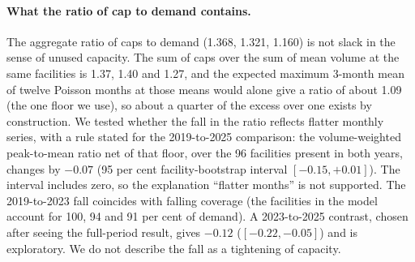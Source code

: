 \paragraph{What the ratio of cap to demand contains.} The aggregate ratio of caps to demand (1.368, 1.321, 1.160) is not slack in
the sense of unused capacity. The sum of caps over the sum of mean volume at the same facilities is 1.37, 1.40 and 1.27, and the expected maximum 3-month mean of twelve Poisson months at those means would alone give a
ratio of about 1.09 (the one floor we use), so about a quarter of the excess over one exists by construction. We tested whether the fall in the ratio reflects flatter monthly series, with a rule stated for the
2019-to-2025 comparison: the volume-weighted peak-to-mean ratio net of that floor, over the 96 facilities present in both years, changes by $-0.07$ (95 per cent facility-bootstrap interval $[-0.15, +0.01]$). The interval includes
zero, so the explanation ``flatter months'' is not supported. The 2019-to-2023 fall coincides with falling coverage (the facilities in the model account for 100, 94 and 91 per cent of demand). A 2023-to-2025 contrast, chosen after seeing the
full-period result, gives $-0.12$ ($[-0.22, -0.05]$) and is exploratory. We do not describe the fall as a tightening of capacity.

